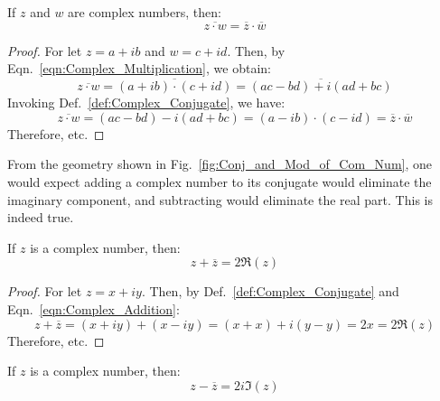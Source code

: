     \begin{theorem}
        If $z$ and $w$ are complex numbers, then:
        \begin{equation}
            \overline{z\cdot{w}}=\overline{z}\cdot\overline{w}
        \end{equation}
    \end{theorem}
    \begin{proof}
        For let $z=a+ib$ and $w=c+id$. Then, by
        Eqn.~\ref{eqn:Complex_Multiplication}, we obtain:
        \begin{equation}
            \overline{z\cdot{w}}=\overline{(a+ib)\cdot(c+id)}
                                =\overline{(ac-bd)+i(ad+bc)}
        \end{equation}
        Invoking Def.~\ref{def:Complex_Conjugate}, we have:
        \begin{equation}
            \overline{z\cdot{w}}=(ac-bd)-i(ad+bc)
                                =(a-ib)\cdot(c-id)
                                =\overline{z}\cdot\overline{w}
        \end{equation}
        Therefore, etc.
    \end{proof}
    From the geometry shown in Fig.~\ref{fig:Conj_and_Mod_of_Com_Num},
    one would expect adding a complex number to its conjugate would
    eliminate the imaginary component, and subtracting would eliminate
    the real part. This is indeed true.
    \begin{theorem}
        \label{thm:Sum_with_Conj_is_Real}%
        If $z$ is a complex number, then:
        \begin{equation}
            z+\overline{z}=2\Re(z)
        \end{equation}
    \end{theorem}
    \begin{proof}
        For let $z=x+iy$. Then, by Def.~\ref{def:Complex_Conjugate}
        and Eqn.~\ref{eqn:Complex_Addition}:
        \begin{equation}
            z+\overline{z}=(x+iy)+(x-iy)
                          =(x+x)+i(y-y)
                          =2x
                          =2\Re(z)
        \end{equation}
        Therefore, etc.
    \end{proof}
    \begin{theorem}
        If $z$ is a complex number, then:
        \begin{equation}
            z-\overline{z}=2i\Im(z)
        \end{equation}
    \end{theorem}
